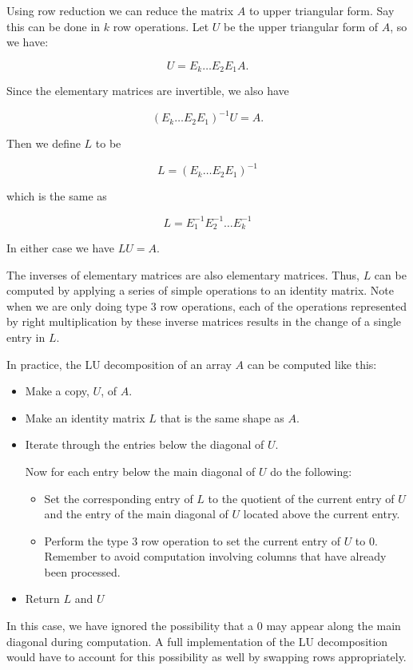 Using row reduction we can reduce the matrix $A$ to upper triangular form. Say this can be done in $k$ row operations.
Let $U$ be the upper triangular form of $A$, so we have:

\[
U = E_k \dots E_2 E_1 A.
\]

Since the elementary matrices are invertible, we also have

\[
(E_k \dots E_2 E_1)^{-1} U =  A.
\]

Then we define $L$ to be

\[
L = (E_k \dots E_2 E_1)^{-1}
\]

which is the same as

\[
L = E_1^{-1} E_2^{-1} \dots E_k^{-1}
\]

In either case we have $L U = A$.

The inverses of elementary matrices are also elementary matrices. Thus, $L$ can be computed by applying a series of simple operations to an identity matrix.
Note when we are only doing type 3 row operations, each of the operations represented by right multiplication by these inverse matrices results in the change of a single entry in $L$.

In practice, the LU decomposition of an array $A$ can be computed like this:

\begin{itemize}
\item Make a copy, $U$, of $A$.
\item Make an identity matrix $L$ that is the same shape as $A$.
\item Iterate through the entries below the diagonal of $U$.

Now for each entry below the main diagonal of $U$ do the following:
	\begin{itemize}
	\item Set the corresponding entry of $L$ to the quotient of the current entry of $U$ and the entry of the main diagonal of $U$ located above the current entry.
	\item Perform the type 3 row operation to set the current entry of $U$ to 0.
		Remember to avoid computation involving columns that have already been processed.
	\end{itemize}
\item Return $L$ and $U$
\end{itemize}

In this case, we have ignored the possibility that a 0 may appear along the main diagonal during computation. A full implementation of the LU decomposition would have to account for this possibility as well by swapping rows appropriately.


